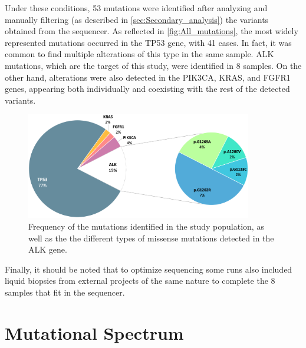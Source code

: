 Under these conditions, 53 mutations were identified after analyzing and manually filtering (as described in \autoref{sec:Secondary_analysis}) the variants obtained from the sequencer. As reflected in \autoref{fig:All_mutations}, the most widely represented mutations occurred in the TP53 gene, with 41 cases. In fact, it was common to find multiple alterations of this type in the same sample. ALK mutations, which are the target of this study, were identified in 8 samples. On the other hand, alterations were also detected in the PIK3CA, KRAS, and FGFR1 genes, appearing both individually and coexisting with the rest of the detected variants.

\begin{figure}[ht]
    \centering
    \includegraphics[width=0.88\textwidth]{Images/chapter_4/all_mutations.png}
    \caption{Frequency of the mutations identified in the study population, as well as the the different types of missense mutations detected in the ALK gene.}
    \label{fig:All_mutations}
\end{figure}

Finally, it should be noted that to optimize sequencing some runs also included liquid biopsies from external projects of the same nature to complete the 8 samples that fit in the sequencer.

\section{Mutational Spectrum}


 

